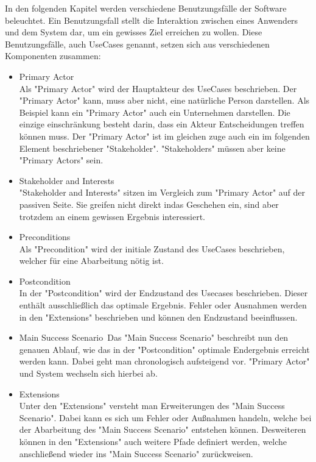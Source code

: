 \documentclass[../../Pflichtenheft.tex]{subfiles}
\begin{document}
In den folgenden Kapitel werden verschiedene Benutzungsfälle der Software beleuchtet.
Ein Benutzungsfall stellt die Interaktion zwischen eines Anwenders und dem System dar, um ein gewisses Ziel erreichen zu wollen.
Diese Benutzungsfälle, auch UseCases genannt, setzen sich aus verschiedenen Komponenten zusammen:
    \begin{itemize}
        \item Primary Actor\\
            Als "Primary Actor" wird der Hauptakteur des UseCases beschrieben.
            Der "Primary Actor" kann, muss aber nicht, eine natürliche Person darstellen. Als Beispiel kann ein "Primary Actor" auch
            ein Unternehmen darstellen. Die einzige einschränkung besteht darin, dass ein Akteur Entscheidungen treffen können muss.
            Der "Primary Actor" ist im gleichen zuge auch ein im folgenden Element beschriebener "Stakeholder". "Stakeholders" müssen
            aber keine "Primary Actors" sein.
        \item Stakeholder and Interests\\
            "Stakeholder and Interests" sitzen im Vergleich zum "Primary Actor" auf der passiven Seite. Sie greifen nicht direkt
            indas Geschehen ein, sind aber trotzdem an einem gewissen Ergebnis interessiert.
        \item Preconditions\\
            Als "Precondition" wird der initiale Zustand des UseCases beschrieben, welcher für eine Abarbeitung nötig ist.
        \item Postcondition\\
            In der "Postcondition" wird der Endzustand des Usecases beschrieben. Dieser enthält ausschließlich das optimale Ergebnis.
            Fehler oder Ausnahmen werden in den "Extensions" beschrieben und können den Endzustand beeinflussen.
        \item Main Success Scenario\
            Das "Main Success Scenario" beschreibt nun den genauen Ablauf, wie das in der "Postcondition" optimale Endergebnis erreicht werden kann.
            Dabei geht man chronologisch aufsteigend vor. "Primary Actor" und System wechseln sich hierbei ab.
        \item Extensions\\
            Unter den "Extensions" versteht man Erweiterungen des "Main Success Scenario". Dabei kann es sich um Fehler oder Außnahmen handeln,
            welche bei der Abarbeitung des "Main Success Scenario" entstehen können. Desweiteren können in den "Extensions" auch
            weitere Pfade definiert werden, welche anschließend wieder ins "Main Success Scenario"  zurückweisen.
    \end{itemize}
\end{document}
